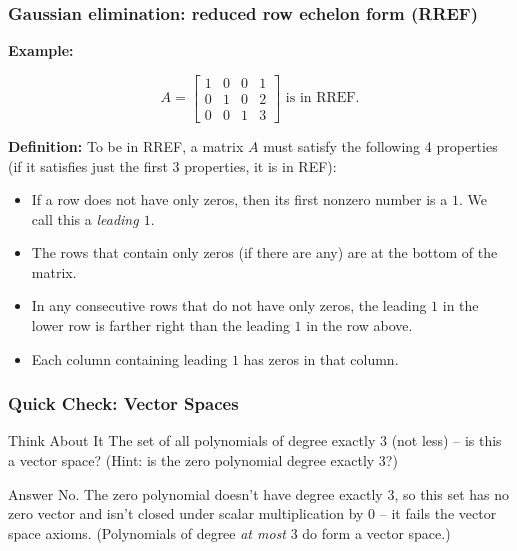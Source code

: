 \begin{frame}[fragile]
\frametitle{Gaussian elimination: reduced row echelon form (RREF)}

\textbf{Example:}


$$A = \left[ \begin{array}{cccc}
\boxed{1} & 0 & 0 & 1 \\
0 & \boxed{1} & 0 & 2 \\
0 & 0 &  \boxed{1} & 3   
\end{array} \right] \text{ is in RREF.}$$

\textbf{Definition:} To be in RREF, a matrix $A$ must satisfy the following 4 properties (if it satisfies just the first 3 properties, it is in REF):

\begin{itemize}

\item If a row does not have only zeros, then its first nonzero number is a $1$. We call this a {\em leading $1$}.

\item The rows that contain only zeros (if there are any) are at the bottom of the matrix.

\item In any consecutive rows that do not have only zeros, the leading $1$ in the lower row is farther right than the leading $1$ in the row above.

\item Each column containing leading $1$ has zeros in that column.



\end{itemize}


\end{frame}

\begin{frame}[fragile]\frametitle{Quick Check: Vector Spaces}
\begin{block}{Think About It}
The set of all polynomials of degree exactly 3 (not less) -- is this a vector space? (Hint: is the zero polynomial degree exactly 3?)
\end{block}
\pause
\begin{block}{Answer}
No. The zero polynomial doesn't have degree exactly 3, so this set has no zero vector and isn't closed under scalar multiplication by 0 -- it fails the vector space axioms. (Polynomials of degree \emph{at most} 3 do form a vector space.)
\end{block}
\end{frame}

